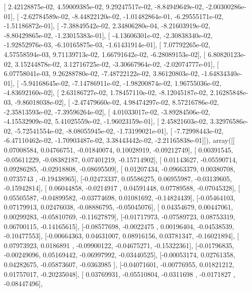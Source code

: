 \documentclass{article}
\begin{document}
       [  2.42128875e-02,   4.59009385e-02,   9.29247517e-02,
         -8.84949649e-02,  -2.00300286e-01],
       [ -2.62784589e-02,  -8.44822120e-02,  -1.01482864e-01,
         -6.29555171e-02,  -1.51186872e-01],
       [ -7.38849542e-02,   2.34806280e-04,  -8.21603919e-02,
         -8.80429865e-02,  -1.23015383e-01],
       [ -4.13606301e-02,  -2.30838340e-02,  -1.92852976e-03,
         -6.10165875e-03,  -1.61431914e-01],
       [  7.07792265e-02,   4.57558594e-03,   9.71139713e-02,
          1.66791642e-02,  -6.28089153e-02],
       [  6.80820123e-02,   3.15244878e-02,   3.12716725e-02,
         -3.30667964e-02,  -2.02074777e-01],
       [  6.07758041e-03,   9.26288780e-02,  -7.48722122e-02,
          3.86120803e-02,  -1.64834340e-01],
       [ -5.94168645e-02,  -7.14786911e-02,  -1.98200874e-02,
          1.96755036e-02,  -4.83692160e-02],
       [  2.63186727e-02,   1.78457110e-02,  -8.12045187e-02,
          2.16285848e-03,  -9.86018038e-02],
       [ -2.47479660e-02,   4.98474297e-02,   8.57216786e-02,
         -2.35813593e-02,  -7.39596264e-02],
       [  4.01033017e-02,  -3.89284506e-02,  -4.15532909e-02,
          5.41025559e-02,  -1.96023159e-01],
       [  2.45821603e-02,   3.32976586e-02,  -5.72541554e-02,
         -8.08055945e-02,  -1.73199021e-01],
       [ -7.72998443e-02,  -6.47110462e-02,  -1.70903487e-02,
          3.38443442e-02,  -2.21165838e-01]]), array([[ 0.07008584,  0.04766751, -0.01840074,  0.10028919, -0.09212749],
       [ 0.00391545, -0.05611229, -0.08382187,  0.07401219, -0.15714902],
       [ 0.01143627, -0.05590714,  0.09286285, -0.02918808, -0.08695509],
       [ 0.01207434, -0.09663379,  0.00380708,  0.0735743 , -0.19438965],
       [-0.02473337,  0.05586275,  0.06955987, -0.03139605, -0.15942814],
       [ 0.06044858, -0.0214917 ,  0.04591448,  0.07789588, -0.07045328],
       [ 0.05505587, -0.04899582, -0.03774698,  0.01081692, -0.14824439],
       [-0.05464103,  0.07179913,  0.02476038, -0.08886795, -0.05045076],
       [ 0.04354679,  0.00447061,  0.00299283, -0.05810769, -0.11627879],
       [-0.01717973, -0.07589723,  0.08753319,  0.06700115, -0.14165615],
       [-0.08577698, -0.0022475 ,  0.00196404, -0.04538539, -0.10477553],
       [-0.00664363,  0.04631007,  0.08916156,  0.03781347, -0.16021894],
       [ 0.07973923,  0.0186891 , -0.09900122, -0.04675271, -0.15322361],
       [-0.01796835, -0.00249096,  0.05169442, -0.06997992, -0.03440525],
       [-0.00053174,  0.02761358,  0.04282675, -0.05873607, -0.0363985 ],
       [-0.04071601, -0.00776955,  0.01821212,  0.01757017, -0.20235048],
       [ 0.03769931, -0.05510804, -0.0311698 , -0.0171827 , -0.08447496],
\end{document}
